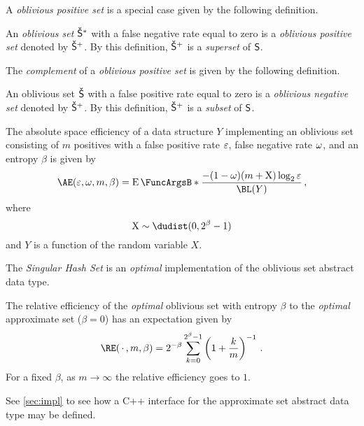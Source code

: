 \documentclass[ ../main.tex]{subfiles}
\begin{document}
A \emph{oblivious positive set} is a special case given by the following definition.
\begin{definition}
\label{def:pos_ob_set}
An \emph{oblivious set} $\OASet{S}$ with a false negative rate equal to zero is a \emph{oblivious positive set} denoted by $\OPASet{S}$. By this definition, $\OPASet{S}$ is a \emph{superset} of $\Set{S}$.
\end{definition}
The \emph{complement} of a \emph{oblivious positive set} is given by the following definition.
\begin{definition}
\label{def:neg_ob_set}
An oblivious set $\OSet{S}$ with a false positive rate equal to zero is a \emph{oblivious negative set} denoted by $\ONASet{S}$. By this definition, $\ONASet{S}$ is a \emph{subset} of $\Set{S}$.
\end{definition}

The absolute space efficiency of a data structure $Y$ implementing an oblivious set consisting of $m$ positives with a false positive rate $\varepsilon$, false negative rate $\omega$, and an entropy $\beta$ is given by
\begin{equation}
    \AE(\fprate, \fnrate, m, \beta) = \Expect{\frac{-(1 - \fnrate)(m + \RV{X}) \log_2 \fprate}{\BL(Y)}}\,,
\end{equation}
where
\begin{equation}
    \RV{X} \sim \dudist(0,2^\beta - 1)
\end{equation}
and $Y$ is a function of the random variable $X$.

The \emph{Singular Hash Set} is an \emph{optimal} implementation of the oblivious set abstract data type.

The relative efficiency of the \emph{optimal} oblivious set with entropy $\beta$ to the \emph{optimal} approximate set ($\beta = 0$) has an expectation given by
\begin{equation}
    \RE(\,\cdot\,, m, \beta) = 2^{-\beta} \sum_{k=0}^{2^\beta-1} \left(1 + \frac{k}{m}\right)^{-1}\,.
\end{equation}
For a fixed $\beta$, as $m \to \infty$ the relative efficiency goes to $1$.

See \cref{sec:impl} to see how a C++ interface for the approximate set abstract data type may be defined.
\end{document}
